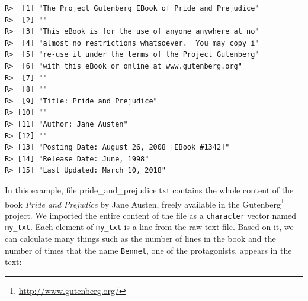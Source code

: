 \documentclass[
  12pt,
]{book}
\begin{document}
\begin{verbatim}
R>  [1] "The Project Gutenberg EBook of Pride and Prejudice"
R>  [2] ""                                                  
R>  [3] "This eBook is for the use of anyone anywhere at no"
R>  [4] "almost no restrictions whatsoever.  You may copy i"
R>  [5] "re-use it under the terms of the Project Gutenberg"
R>  [6] "with this eBook or online at www.gutenberg.org"    
R>  [7] ""                                                  
R>  [8] ""                                                  
R>  [9] "Title: Pride and Prejudice"                        
R> [10] ""                                                  
R> [11] "Author: Jane Austen"                               
R> [12] ""                                                  
R> [13] "Posting Date: August 26, 2008 [EBook #1342]"       
R> [14] "Release Date: June, 1998"                          
R> [15] "Last Updated: March 10, 2018"
\end{verbatim}

In this example, file pride\_and\_prejudice.txt contains the whole content of the book \emph{Pride and Prejudice} by Jane Austen, freely available in the \href{http://www.gutenberg.org/}{Gutenberg}\footnote{\url{http://www.gutenberg.org/}} project. We imported the entire content of the file as a \texttt{character} vector named \texttt{my\_txt}. Each element of \texttt{my\_txt} is a line from the raw text file. Based on it, we can calculate many things such as the number of lines in the book and the number of times that the name \texttt{\textquotesingle{}Bennet\textquotesingle{}}, one of the protagonists, appears in the text:
\end{document}

